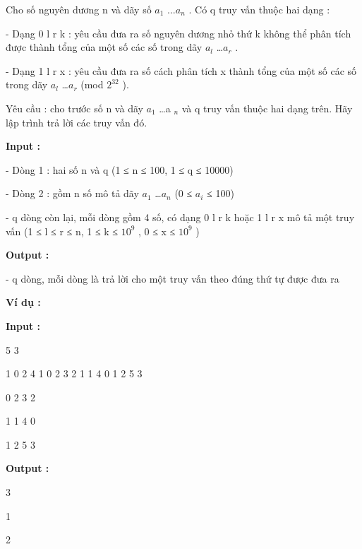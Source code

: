 







   Cho số nguyên dương n và dãy số $a_{1}$   ...$a_{n}$   . Có q truy vấn thuộc hai dạng :  

   - Dạng 0 l r k : yêu cầu đưa ra số nguyên dương nhỏ thứ k không thể phân tích được thành tổng của một số các số trong dãy $a_{l}$   …$a_{r}$   .  

   - Dạng 1 l r x : yêu cầu đưa ra số cách phân tích x thành tổng của một số các số trong dãy $a_{l}$   …$a_{r}$   (mod $2^{32}$   ).  

   Yêu cầu : cho trước số n và dãy $a_{1}$   …a­   $_    n   $   và q truy vấn thuộc hai dạng trên. Hãy lập trình trả lời các truy vấn đó.  

\textbf{    Input :   }

\textbf{}   - Dòng 1 : hai số n và q (1 ≤ n ≤ 100, 1 ≤ q ≤ 10000)  

   - Dòng 2 : gồm n số mô tả dãy $a_{1}$   …$a_{n}$   (0 ≤ $a_{i}$   ≤ 100)  

   - q dòng còn lại, mỗi dòng gồm 4 số, có dạng 0 l r k hoặc 1 l r x mô tả một truy vấn (1 ≤ l ≤ r ≤ n, 1 ≤ k ≤ $10^{9}$   , 0 ≤ x ≤ $10^{9}$   )  

\textbf{    Output :   }

\textbf{}   - q dòng, mỗi dòng là trả lời cho một truy vấn theo đúng thứ tự được đưa ra  

\textbf{    Ví dụ :   }

\textbf{    Input :   }

\textbf{}   5 3  

   1 0 2 4 1       0 2 3 2       1 1 4 0       1 2 5 3    

   0 2 3 2  

   1 1 4 0  

   1 2 5 3  

\textbf{    Output :   }

   3  

   1  

   2  

